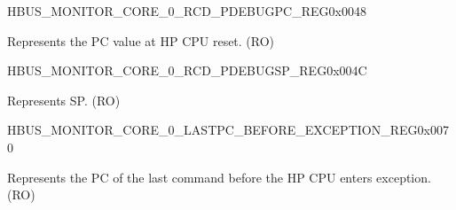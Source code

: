 \begin{register}{H}{BUS\_MONITOR\_CORE\_0\_RCD\_PDEBUGPC\_REG}{0x0048}\label{regdesc:BUSMONITORCORE0RCDPDEBUGPCREG}
%
\regnewline%
\begin{regdesc}\begin{reglist}
\label{fielddesc:BUSMONITORCORE0RCDPDEBUGPC}\item [BUS\_MONITOR\_CORE\_0\_RCD\_PDEBUGPC] Represents the PC value at HP CPU reset. (RO)
\end{reglist}\end{regdesc}
\end{register}


\begin{register}{H}{BUS\_MONITOR\_CORE\_0\_RCD\_PDEBUGSP\_REG}{0x004C}\label{regdesc:BUSMONITORCORE0RCDPDEBUGSPREG}
%
\regnewline%
\begin{regdesc}\begin{reglist}
\label{fielddesc:BUSMONITORCORE0RCDPDEBUGSP}\item [BUS\_MONITOR\_CORE\_0\_RCD\_PDEBUGSP] Represents SP. (RO)
\end{reglist}\end{regdesc}
\end{register}


\begin{register}{H}{BUS\_MONITOR\_CORE\_0\_LASTPC\_BEFORE\_EXCEPTION\_REG}{0x0070}\label{regdesc:BUSMONITORCORE0LASTPCBEFOREEXCEPTIONREG}
%
\regnewline%
\begin{regdesc}\begin{reglist}
\label{fielddesc:BUSMONITORCORE0LASTPCBEFOREEXC}\item [BUS\_MONITOR\_CORE\_0\_LASTPC\_BEFORE\_EXC] Represents the PC of the last command before the HP CPU enters exception. (RO)
\end{reglist}\end{regdesc}
\end{register}


